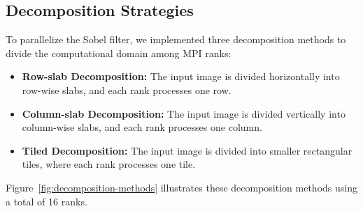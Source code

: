 \subsection{Decomposition Strategies}
\label{subsec:decomposition-strategies}
To parallelize the Sobel filter, we implemented three decomposition methods to divide the computational domain among MPI ranks:
\begin{itemize}
    \item \textbf{Row-slab Decomposition:} The input image is divided horizontally into row-wise slabs, and each rank processes one row.
    \item \textbf{Column-slab Decomposition:} The input image is divided vertically into column-wise slabs, and each rank processes one column.
    \item \textbf{Tiled Decomposition:} The input image is divided into smaller rectangular tiles, where each rank processes one tile.
\end{itemize}

Figure~\ref{fig:decomposition-methods} illustrates these decomposition methods using a total of 16 ranks.

